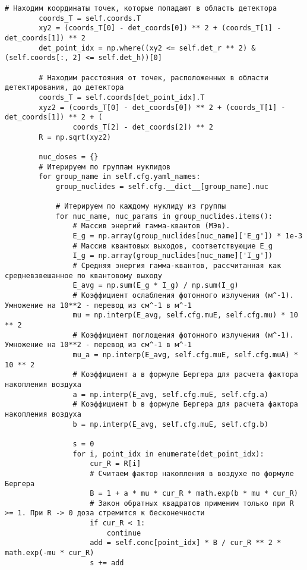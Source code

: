 \begin{lstlisting}[caption=Исходный код модуля расчета мощности эквивалентной дозы внешнего гамма-излучения, 
                    label={lst_dose_calc}, basicstyle=\scriptsize]
        # Находим координаты точек, которые попадают в область детектора
        coords_T = self.coords.T
        xy2 = (coords_T[0] - det_coords[0]) ** 2 + (coords_T[1] - det_coords[1]) ** 2
        det_point_idx = np.where((xy2 <= self.det_r ** 2) & (self.coords[:, 2] <= self.det_h))[0]

        # Находим расстояния от точек, расположенных в области детектирования, до детектора
        coords_T = self.coords[det_point_idx].T
        xyz2 = (coords_T[0] - det_coords[0]) ** 2 + (coords_T[1] - det_coords[1]) ** 2 + (
                coords_T[2] - det_coords[2]) ** 2
        R = np.sqrt(xyz2)

        nuc_doses = {}
        # Итерируем по группам нуклидов
        for group_name in self.cfg.yaml_names:
            group_nuclides = self.cfg.__dict__[group_name].nuc

            # Итерируем по каждому нуклиду из группы
            for nuc_name, nuc_params in group_nuclides.items():
                # Массив энергий гамма-квантов (МЭв).
                E_g = np.array(group_nuclides[nuc_name]['E_g']) * 1e-3
                # Массив квантовых выходов, соответствующие E_g
                I_g = np.array(group_nuclides[nuc_name]['I_g'])
                # Средняя энергия гамма-квантов, рассчитанная как средневзвешанное по квантовому выходу
                E_avg = np.sum(E_g * I_g) / np.sum(I_g)
                # Коэффициент ослабления фотонного излучения (м^-1). Умножение на 10**2 - перевод из см^-1 в м^-1
                mu = np.interp(E_avg, self.cfg.muE, self.cfg.mu) * 10 ** 2
                # Коэффициент поглощения фотонного излучения (м^-1). Умножение на 10**2 - перевод из см^-1 в м^-1
                mu_a = np.interp(E_avg, self.cfg.muE, self.cfg.muA) * 10 ** 2
                # Коэффициент a в формуле Бергера для расчета фактора накопления воздуха
                a = np.interp(E_avg, self.cfg.muE, self.cfg.a)
                # Коэффициент b в формуле Бергера для расчета фактора накопления воздуха
                b = np.interp(E_avg, self.cfg.muE, self.cfg.b)

                s = 0
                for i, point_idx in enumerate(det_point_idx):
                    cur_R = R[i]
                    # Считаем фактор накопления в воздухе по формуле Бергера
                    B = 1 + a * mu * cur_R * math.exp(b * mu * cur_R)
                    # Закон обратных квадратов применим только при R >= 1. При R -> 0 доза стремится к бесконечности
                    if cur_R < 1:
                        continue
                    add = self.conc[point_idx] * B / cur_R ** 2 * math.exp(-mu * cur_R)
                    s += add


\end{lstlisting}
